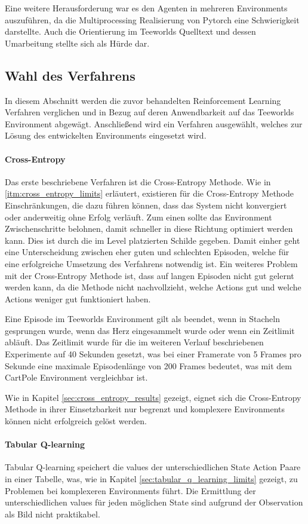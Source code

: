 \documentclass[11pt]{scrartcl}
\begin{document}
Eine weitere Herausforderung war es den Agenten in mehreren Environments auszuführen, da
die Multiprocessing Realisierung von Pytorch eine Schwierigkeit darstellte. Auch die
Orientierung im Teeworlds Quelltext und dessen Umarbeitung stellte sich als Hürde dar.

\subsection{Wahl des Verfahrens}
In diesem Abschnitt werden die zuvor behandelten Reinforcement Learning Verfahren
verglichen und in Bezug auf deren Anwendbarkeit auf das Teeworlds Environment abgewägt.
Anschließend wird ein Verfahren ausgewählt, welches zur Lösung des entwickelten
Environments eingesetzt wird.

\paragraph{Cross-Entropy}
Das erste beschriebene Verfahren ist die Cross-Entropy Methode. Wie in
\autoref{itm:cross_entropy_limits} erläutert, existieren für die Cross-Entropy Methode
Einschränkungen, die dazu führen können, dass das System nicht konvergiert oder anderweitig
ohne Erfolg verläuft. Zum einen sollte das Environment Zwischenschritte belohnen,
damit schneller in diese Richtung optimiert werden kann. Dies ist durch die im Level
platzierten Schilde gegeben. Damit einher geht eine Unterscheidung zwischen eher guten
und schlechten Episoden, welche für eine erfolgreiche Umsetzung des Verfahrens notwendig
ist. Ein weiteres Problem mit der Cross-Entropy Methode ist, dass auf langen Episoden
nicht gut gelernt werden kann, da die Methode nicht nachvollzieht, welche Actions gut
und welche Actions weniger gut funktioniert haben. 

Eine Episode im Teeworlds Environment gilt als beendet, wenn in Stacheln gesprungen wurde, 
wenn das Herz eingesammelt wurde oder wenn ein Zeitlimit abläuft. Das Zeitlimit wurde für
die im weiteren Verlauf beschriebenen Experimente auf 40 Sekunden gesetzt, was bei einer
Framerate von 5 Frames pro Sekunde eine maximale Episodenlänge von 200 Frames bedeutet,
was mit dem CartPole Environment vergleichbar ist.

Wie in Kapitel \ref{sec:cross_entropy_results} gezeigt, eignet sich die Cross-Entropy
Methode in ihrer Einsetzbarkeit nur begrenzt und komplexere Environments können nicht
erfolgreich gelöst werden.

\paragraph{Tabular Q-learning}
Tabular Q-learning speichert die values der unterschiedlichen State Action Paare in einer
Tabelle, was, wie in Kapitel \ref{sec:tabular_q_learning_limits} gezeigt, zu Problemen bei
komplexeren Environments führt. Die Ermittlung der unterschiedlichen values für jeden
möglichen State sind aufgrund der Observation als Bild nicht praktikabel.
\end{document}

